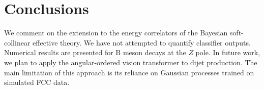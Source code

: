 \section{Conclusions}\label{sec:conclusions}

We comment on the extension to the energy correlators of the Bayesian
soft-collinear effective theory. We have not attempted to quantify
classifier outputs. Numerical results are presented for B meson decays
at the $Z$ pole. In future work, we plan to apply the angular-ordered
vision transformer to dijet production. The main limitation of this
approach is its reliance on Gaussian processes trained on simulated FCC
data.

